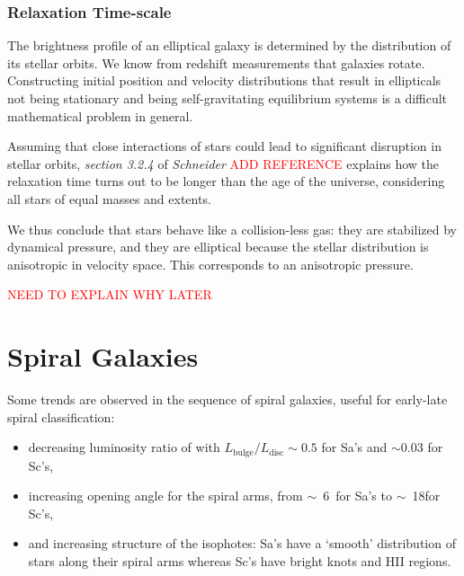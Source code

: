 \documentclass[a4paper,11pt]{report}
\newcommand{\ti}[1]{\textit{#1}}
\newcommand{\red}[1]{\textcolor{red}{#1}}
\newcommand{\tsim}{$\sim$}
\begin{document}
\subsubsection{Relaxation Time-scale}
The brightness profile of an elliptical galaxy is determined by the distribution of its stellar orbits. We know from redshift measurements that galaxies rotate. Constructing initial position and velocity distributions that result in ellipticals not being stationary and being self-gravitating equilibrium systems is a difficult mathematical problem in general.

\vspace{1em}

Assuming that close interactions of stars could lead to significant disruption in stellar orbits, \ti{section 3.2.4} of \ti{Schneider} \red{ADD REFERENCE} explains how the relaxation time turns out to be longer than the age of the universe, considering all stars of equal masses and extents.

\begin{framed}
  We thus conclude that stars behave like a collision-less gas: they are stabilized by dynamical pressure, and they are elliptical because the stellar distribution is anisotropic in velocity space. This corresponds to an anisotropic pressure.
\end{framed}

\red{NEED TO EXPLAIN WHY LATER}

\section{Spiral Galaxies}
Some trends are observed in the sequence of spiral galaxies, useful for early-late spiral classification:

\begin{itemize}
  \item decreasing luminosity ratio of with $L_\text{bulge}/L_\text{disc} \sim 0.5$ for Sa's and $\sim 0.03$ for Sc's,
  \item increasing opening angle for the spiral arms, from \tsim\ 6\textdegree\ for Sa's to \tsim\ 18\textdegree for Sc's,
  \item and increasing structure of the isophotes: Sa's have a `smooth' distribution of stars along their spiral arms whereas Sc's have bright knots and H\RN{2} regions.
\end{itemize}

\vspace{1em}
\end{document}
